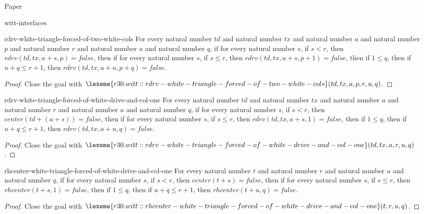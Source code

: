 \begin{lexlean}{Paper}
\begin{section}{witt-interfaces}
  \begin{theorem}{rdrv-white-triangle-forced-of-two-white-cols}
  For every natural number \(td\) and natural number \(tx\) and natural number \(a\) and natural number \(p\) and natural number \(r\) and natural number \(u\) and natural number \(q\), if for every natural number \(s\), if \(s < r\), then \(rdrv(td, tx, a + s, p) = false\), then if for every natural number \(s\), if \(s ≤ r\), then \(rdrv(td, tx, a + s, p + 1) = false\), then if \(1 ≤ q\), then if \(u + q ≤ r + 1\), then \(rdrv(td, tx, a + u, p + q) = false\).
  \begin{proof}
  Close the goal with \(\lexeme{r30.witt::rdrv-white-triangle-forced-of-two-white-cols}(td, tx, a, p, r, u, q)\).
  \end{proof}
  \end{theorem}

  \begin{theorem}{rdrv-white-triangle-forced-of-white-drive-and-col-one}
  For every natural number \(td\) and natural number \(tx\) and natural number \(a\) and natural number \(r\) and natural number \(u\) and natural number \(q\), if for every natural number \(s\), if \(s < r\), then \(center(td + (a + s)) = false\), then if for every natural number \(s\), if \(s ≤ r\), then \(rdrv(td, tx, a + s, 1) = false\), then if \(1 ≤ q\), then if \(u + q ≤ r + 1\), then \(rdrv(td, tx, a + u, q) = false\).
  \begin{proof}
  Close the goal with \(\lexeme{r30.witt::rdrv-white-triangle-forced-of-white-drive-and-col-one}(td, tx, a, r, u, q)\).
  \end{proof}
  \end{theorem}

  \begin{theorem}{rhcenter-white-triangle-forced-of-white-drive-and-col-one}
  For every natural number \(t\) and natural number \(r\) and natural number \(u\) and natural number \(q\), if for every natural number \(s\), if \(s < r\), then \(center(t + s) = false\), then if for every natural number \(s\), if \(s ≤ r\), then \(rhcenter(t + s, 1) = false\), then if \(1 ≤ q\), then if \(u + q ≤ r + 1\), then \(rhcenter(t + u, q) = false\).
  \begin{proof}
  Close the goal with \(\lexeme{r30.witt::rhcenter-white-triangle-forced-of-white-drive-and-col-one}(t, r, u, q)\).
  \end{proof}
  \end{theorem}


\end{section}
\end{lexlean}
